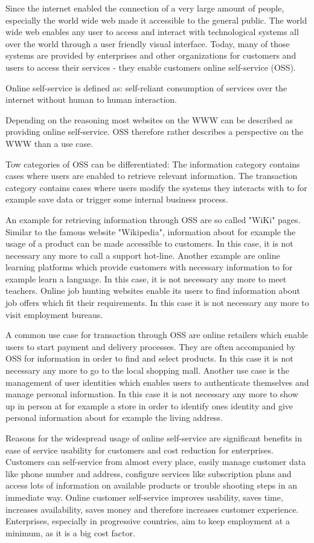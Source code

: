 \documentclass[
     12pt,         %
     a4paper,      %
     BCOR=10mm,version=first,     %
     DIV=14,version=first,        %
     ]{scrreprt}
\begin{document}
Since the internet enabled the connection of a very large amount of people, especially the world wide web made it accessible to the general public. The world wide web enables any user to access and interact with technological systems all over the world through a user friendly visual interface. Today, many of those systems are provided by enterprises and other organizations for customers and users to access their services - they enable customers online self-service (OSS).

Online self-service is defined as: self-reliant consumption of services over the internet without human to human interaction.

Depending on the reasoning most websites on the WWW can be described as providing online self-service. OSS therefore rather describes a perspective on the WWW than a use case.

Tow categories of OSS can be differentiated: The information category contains cases where users are enabled to retrieve relevant information. The transaction category contains cases where users modify the systems they interacts with to for example save data or trigger some internal business process.

An example for retrieving information through OSS are so called "WiKi" pages. Similar to the famous website "Wikipedia", information about for example the usage of a product can be made accessible to customers. In this case, it is not necessary any more to call a support hot-line.
Another example are online learning platforms which provide customers with necessary information to for example learn a language. In this case, it is not necessary any more to meet teachers.
Online job hunting websites enable its users to find information about job offers which fit their requirements. In this case it is not necessary any more to visit employment bureaus.

A common use case for transaction through OSS are online retailers which enable users to start payment and delivery processes. They are often accompanied by OSS for information in order to find and select products. In this case it is not necessary any more to go to the local shopping mall.
Another use case is the management of user identities which enables users to authenticate themselves and manage personal information. In this case it is not necessary any more to show up in person at for example a store in order to identify ones identity and give personal information about for example the living address.

Reasons for the widespread usage of online self-service are significant benefits in ease of service usability for customers and cost reduction for enterprises. Customers can self-service from almost every place, easily manage customer data like phone number and address, configure services like subscription plans and access lots of information on available products or trouble shooting steps in an immediate way. Online customer self-service improves usability, saves time, increases availability, saves money and therefore increases customer experience. Enterprises, especially in progressive countries, aim to keep employment at a minimum, as it is a big cost factor.
\end{document}
